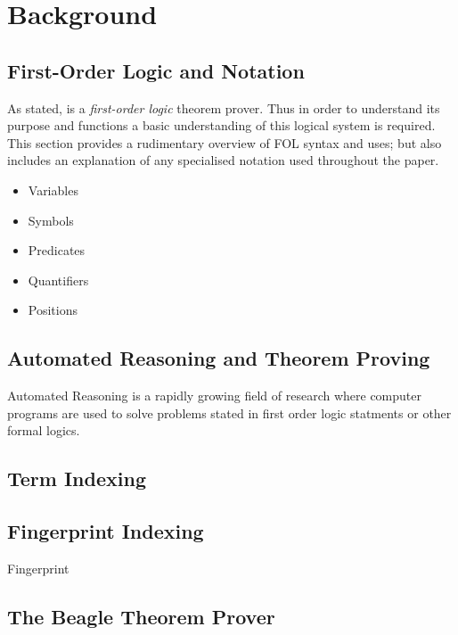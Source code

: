 
\chapter{Background}
\label{cha:background}

\section{First-Order Logic and Notation}
\label{sec:senfol}

As stated, \beagle is a \emph{first-order logic} theorem prover. Thus in order to
understand its purpose and functions a basic understanding of this logical system
is required. This section provides a rudimentary overview of FOL syntax and uses;
but also includes an explanation of any specialised notation used throughout the paper.

\begin{itemize}
\item Variables
\item Symbols
\item Predicates
\item Quantifiers
\end{itemize}


\begin{itemize}
\item Positions
\end{itemize}

\section{Automated Reasoning and Theorem Proving}
\label{sec:proving}

Automated Reasoning is a rapidly growing field of research where computer programs
are used to solve problems stated in first order logic statments or other formal logics. 


\section{Term Indexing}
\label{sec:indexing}

\section{Fingerprint Indexing}
\label{sec:fingerprint}

Fingerprint 

\section{The Beagle Theorem Prover}
\label{sec:beagle}

